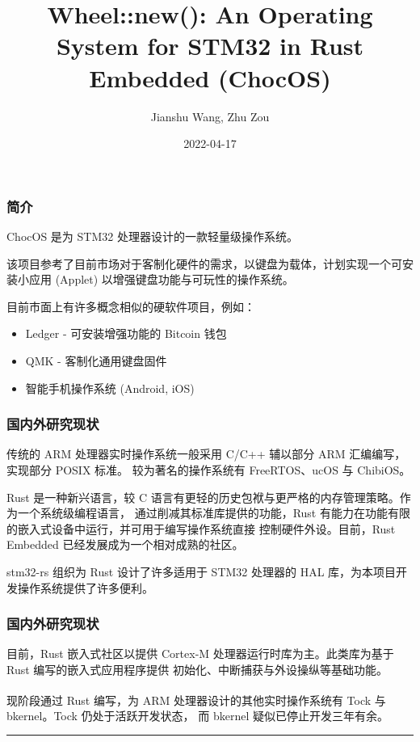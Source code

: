 \documentclass[aspectratio=169]{beamer}
\title{Wheel::new(): An Operating System for STM32 in Rust Embedded (ChocOS)}
\author{Jianshu Wang, Zhu Zou}
\date{2022-04-17}
\begin{document}
\maketitle

\begin{frame}
    \frametitle{简介}
    ChocOS 是为 STM32 处理器设计的一款轻量级操作系统。
    \par
    该项目参考了目前市场对于客制化硬件的需求，以键盘为载体，计划实现一个可安装小应用 (Applet) 
    以增强键盘功能与可玩性的操作系统。
    \par
    目前市面上有许多概念相似的硬软件项目，例如：
    \begin{itemize}
        \item Ledger - 可安装增强功能的 Bitcoin 钱包
        \item QMK - 客制化通用键盘固件
        \item 智能手机操作系统 (Android, iOS)
    \end{itemize}
\end{frame}

\begin{frame}
    \frametitle{国内外研究现状}

    传统的 ARM 处理器实时操作系统一般采用 C/C++ 辅以部分 ARM 汇编编写，实现部分 POSIX 标准。
    较为著名的操作系统有 FreeRTOS、ucOS 与 ChibiOS。
    \par
    Rust 是一种新兴语言，较 C 语言有更轻的历史包袱与更严格的内存管理策略。作为一个系统级编程语言，
    通过削减其标准库提供的功能，Rust 有能力在功能有限的嵌入式设备中运行，并可用于编写操作系统直接
    控制硬件外设。目前，Rust Embedded 已经发展成为一个相对成熟的社区。
    \par
    stm32-rs 组织为 Rust 设计了许多适用于 STM32 处理器的 HAL 库，为本项目开发操作系统提供了许多便利。

\end{frame}

\begin{frame}
    \frametitle{国内外研究现状}

    目前，Rust 嵌入式社区以提供 Cortex-M 处理器运行时库为主。此类库为基于 Rust 编写的嵌入式应用程序提供
    初始化、中断捕获与外设操纵等基础功能。
    \par
    现阶段通过 Rust 编写，为 ARM 处理器设计的其他实时操作系统有 Tock\textsuperscript{\cite{levy17multiprogramming}} 与 bkernel。Tock 仍处于活跃开发状态，
    而 bkernel 疑似已停止开发三年有余。

    \par

    \vfill
    \noindent\rule{2cm}{0.4pt}
    \printbibliography

\end{frame}
\end{document}

